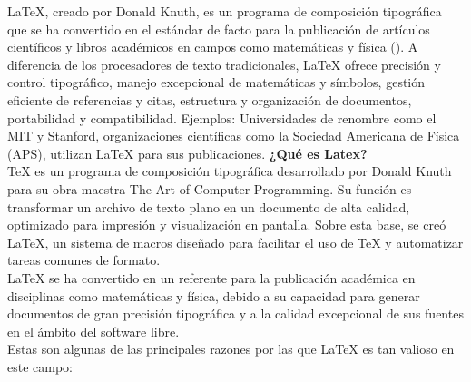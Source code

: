 \documentclass[10pt]{article}
\begin{document}
LaTeX, creado por Donald Knuth, es un programa de composición tipográfica que se ha convertido en el estándar de facto para la publicación de artículos científicos y libros académicos en campos como matemáticas y física (\cite{knuth1997art}). 
A diferencia de los procesadores de texto tradicionales, LaTeX ofrece precisión y control tipográfico, manejo excepcional de matemáticas y símbolos, gestión eficiente de referencias y citas, estructura y organización de documentos, portabilidad y compatibilidad. 
Ejemplos: Universidades de renombre como el MIT y Stanford, organizaciones científicas como la Sociedad Americana de Física (APS), utilizan LaTeX para sus publicaciones.
\textbf{¿Qué es Latex?}\\
TeX es un programa de composición tipográfica desarrollado por Donald Knuth para su obra maestra The Art of Computer Programming. 
Su función es transformar un archivo de texto plano en un documento de alta calidad, optimizado para impresión y visualización en pantalla. 
Sobre esta base, se creó LaTeX, un sistema de macros diseñado para facilitar el uso de TeX y automatizar tareas comunes de formato.\\ 
LaTeX se ha convertido en un referente para la publicación académica en disciplinas como matemáticas y física, debido a su capacidad para generar documentos de gran precisión tipográfica y a la calidad excepcional de sus fuentes en el ámbito del software libre.\\
Estas son algunas de las principales razones por las que LaTeX es tan valioso en este campo:
\end{document}
